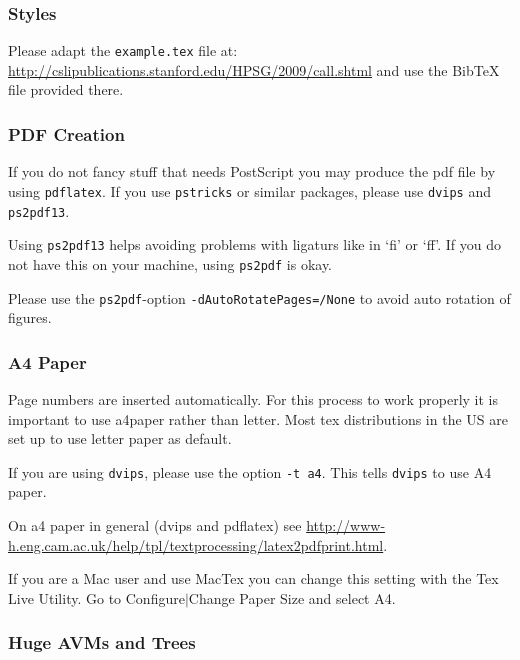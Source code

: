 \documentclass[11pt,a4paper,fleqn]{article}
\begin{document}
\subsubsection{Styles}

Please adapt the \verb+example.tex+ file at:\newline
\url{http://cslipublications.stanford.edu/HPSG/2009/call.shtml}\newline
and use the BibTeX file provided there.

\subsubsection{PDF Creation}

If you do not fancy stuff that needs PostScript you may produce
the pdf file by using \verb+pdflatex+. If you use \verb+pstricks+ or
similar packages, please use \verb+dvips+ and \verb+ps2pdf13+.

Using \verb+ps2pdf13+ helps avoiding problems with ligaturs like in `fi'
or `ff'. If you do not have this on your machine, using \verb+ps2pdf+ is okay.

Please use the \verb+ps2pdf+-option \verb+-dAutoRotatePages=/None+  to avoid auto rotation
of figures.


\subsubsection{A4 Paper}

Page numbers are inserted automatically. For this process to work properly it is important to use
a4paper rather than letter. Most tex distributions in the US are set up to use letter paper as default.

If you are using \verb+dvips+, please use the option \verb+-t a4+. This tells
\verb+dvips+ to use A4 paper.

On a4 paper in general (dvips and pdflatex) see \url{http://www-h.eng.cam.ac.uk/help/tpl/textprocessing/latex2pdfprint.html}.

If you are a Mac user and use MacTex you can change this setting with the Tex Live Utility. Go to
Configure$|$Change Paper Size and select A4.

\subsubsection{Huge AVMs and Trees}
\label{huge}
\end{document}
